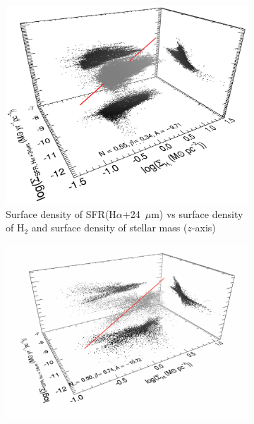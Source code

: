          
\begin{figure}
  \centering
   \begin{subfigure}[b]{0.5\textwidth}
        \centering
        \includegraphics[width=\textwidth]{../image_paper1/es_tot_halpha_vs_h22_f.png}
        \captionsetup{font=tiny}
        \caption{Surface density of SFR(H$\alpha$+24~$\mu$m) vs surface density of H$_2$ and surface density of stellar mass ($z$-axis)}
        \label{fig:es,all,halpha,h2}
    \end{subfigure}
     \hfill
      \begin{subfigure}[b]{0.5\textwidth}
        \centering
        \includegraphics[width=\textwidth]{../image_paper1/es_tot_halpha_vs_hi2.png}

\end{subfigure}
\end{figure}
